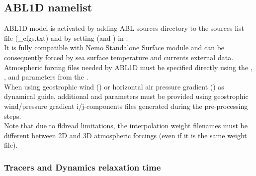 \documentclass[../main/NEMO_manual]{subfiles}
\begin{document}
\subsection{ABL1D namelist}

\begin{listing}
  \caption{}
  \label{lst:namsbc_abl}
\end{listing}

ABL1D model is activated by adding ABL sources directory to the sources list file (\*\_cfgs.txt) and
by setting  (and ) in . \\
It is fully compatible with Nemo Standalone Surface module and can be consequently forced by sea surface temperature and currents external data.\\

Atmospheric forcing files needed by ABL1D must be specified directly using the , ,
 and  parameters from the .\\
When using geostrophic wind ()
or horizontal air pressure gradient () as dynamical guide, additional 
and  parameters must be provided using geostrophic wind/pressure gradient i/j-components files generated during the pre-processing steps.\\
Note that due to fldread limitations, the interpolation weight filenames must be different between 2D and
3D atmospheric forcings (even if it is the same weight file).

\subsubsection{Tracers and Dynamics relaxation time}
\end{document}

